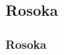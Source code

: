 \documentclass{beamer}
\newenvironment{program}{\begin{beamercolorbox}[rounded=true,shadow=true]{block body}\vspace{-4mm}}{\vspace{-2mm}\end{beamercolorbox}}
\newenvironment{vystup}{\begin{beamercolorbox}[rounded=true,shadow=true]{fvystup}}{\end{beamercolorbox}}
\newenvironment{poznamka}{\begin{beamercolorbox}[rounded=true,shadow=false]{block body}}{\end{beamercolorbox}}
\begin{document}
\subsection{Rosoka}
\begin{frame}[fragile=singleslide]\frametitle{\textbf{Rosoka}}
\end{frame}


%
%
%
%
%
%
%
%
%
\end{document}
